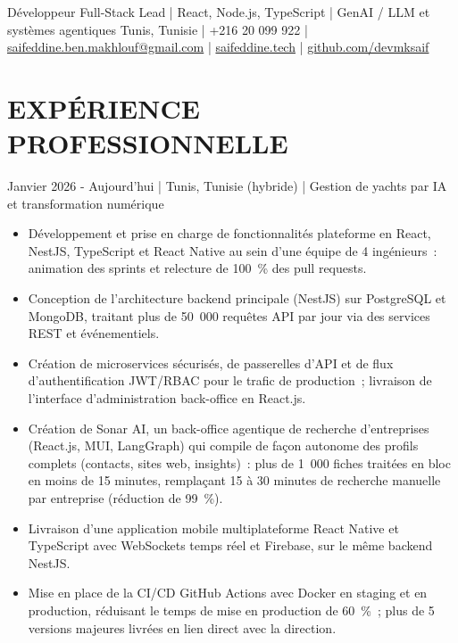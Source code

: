 


  {Développeur Full-Stack Lead | React, Node.js, TypeScript | GenAI / LLM et systèmes agentiques}
  {Tunis, Tunisie | +216 20 099 922 | \href{mailto:saifeddine.ben.makhlouf@gmail.com}{saifeddine.ben.makhlouf@gmail.com} | \href{https://saifeddine.tech/fr/}{saifeddine.tech} | \href{https://github.com/devmksaif}{github.com/devmksaif}}

\section{EXPÉRIENCE PROFESSIONNELLE}

  {Janvier 2026 - Aujourd'hui | Tunis, Tunisie (hybride) | Gestion de yachts par IA et transformation numérique}
\begin{itemize}
  \item Développement et prise en charge de fonctionnalités plateforme en React, NestJS, TypeScript et React Native au sein d'une équipe de 4 ingénieurs~: animation des sprints et relecture de 100~\% des pull requests.
  \item Conception de l'architecture backend principale (NestJS) sur PostgreSQL et MongoDB, traitant plus de 50~000 requêtes API par jour via des services REST et événementiels.
  \item Création de microservices sécurisés, de passerelles d'API et de flux d'authentification JWT/RBAC pour le trafic de production~; livraison de l'interface d'administration back-office en React.js.
  \item Création de Sonar AI, un back-office agentique de recherche d'entreprises (React.js, MUI, LangGraph) qui compile de façon autonome des profils complets (contacts, sites web, insights)~: plus de 1~000 fiches traitées en bloc en moins de 15 minutes, remplaçant 15 à 30 minutes de recherche manuelle par entreprise (réduction de 99~\%).
  \item Livraison d'une application mobile multiplateforme React Native et TypeScript avec WebSockets temps réel et Firebase, sur le même backend NestJS.
  \item Mise en place de la CI/CD GitHub Actions avec Docker en staging et en production, réduisant le temps de mise en production de 60~\%~; plus de 5 versions majeures livrées en lien direct avec la direction.
\end{itemize}

